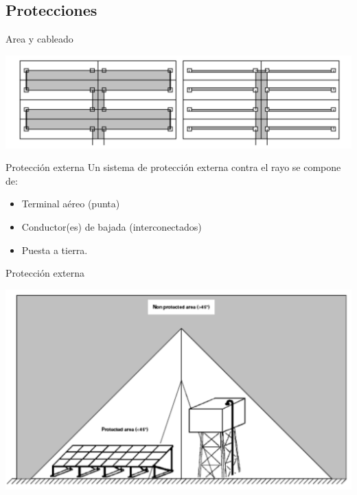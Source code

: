 \documentclass[xcolor={usenames,svgnames,dvipsnames}]{beamer}
\begin{document}
\subsection{Protecciones}
\label{sec:orga74b83a}


\begin{frame}[label={sec:org1c863c7}]{Area y cableado}
\begin{center}
\includegraphics[width=.9\linewidth]{../figs/BucleCableadoOptimo.pdf}
\end{center}
\end{frame}

\begin{frame}[label={sec:org42d0a4c}]{Protección externa}
Un sistema de protección externa contra el rayo se compone de:

\begin{itemize}
\item Terminal aéreo (punta)

\item Conductor(es) de bajada (interconectados)

\item Puesta a tierra.
\end{itemize}
\end{frame}

\begin{frame}[label={sec:orgbc256f6}]{Protección externa}
\begin{center}
\includegraphics[width=.9\linewidth]{../figs/AreaProteccionPararrayos.pdf}
\end{center}
\end{frame}
\end{document}
